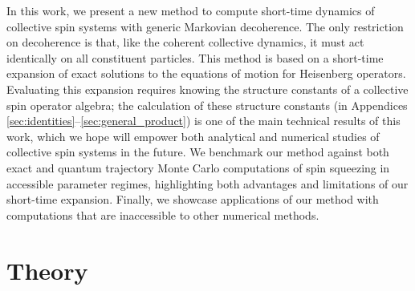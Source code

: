 \documentclass[pra,twocolumn,longbibliography]{revtex4-2}
\newcommand{\1}{\mathds{1}}
\begin{document}
In this work, we present a new method to compute short-time dynamics
of collective spin systems with generic Markovian decoherence.  The
only restriction on decoherence is that, like the coherent collective
dynamics, it must act identically on all constituent particles.  This
method is based on a short-time expansion of exact solutions to the
equations of motion for Heisenberg operators.  Evaluating this
expansion requires knowing the structure constants of a collective
spin operator algebra; the calculation of these structure constants
(in Appendices \ref{sec:identities}--\ref{sec:general_product}) is one
of the main technical results of this work, which we hope will empower
both analytical and numerical studies of collective spin systems in
the future.  We benchmark our method against both exact and quantum
trajectory Monte Carlo computations of spin squeezing in accessible
parameter regimes, highlighting both advantages and limitations of our
short-time expansion.  Finally, we showcase applications of our method
with computations that are inaccessible to other numerical methods.


\section{Theory}
\end{document}
